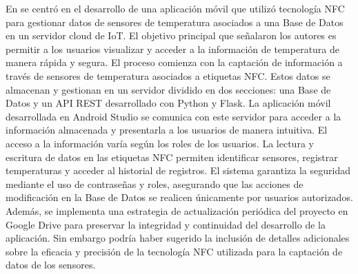 \bigbreak
En \cite{castillo_herrero_desarrollo_2020} se centró en el desarrollo de una aplicación móvil que utilizó tecnología NFC para gestionar datos de sensores de temperatura asociados a una Base de Datos en un servidor cloud de IoT. El objetivo principal que señalaron los autores es permitir a los usuarios visualizar y acceder a la información de temperatura de manera rápida y segura. El proceso comienza con la captación de información a través de sensores de temperatura asociados a etiquetas NFC. Estos datos se almacenan y gestionan en un servidor dividido en dos secciones: una Base de Datos y un API REST desarrollado con Python y Flask. La aplicación móvil desarrollada en Android Studio se comunica con este servidor para acceder a la información almacenada y presentarla a los usuarios de manera intuitiva. El acceso a la información varía según los roles de los usuarios. La lectura y escritura de datos en las etiquetas NFC permiten identificar sensores, registrar temperaturas y acceder al historial de registros. El sistema garantiza la seguridad mediante el uso de contraseñas y roles, asegurando que las acciones de modificación en la Base de Datos se realicen únicamente por usuarios autorizados. Además, se implementa una estrategia de actualización periódica del proyecto en Google Drive para preservar la integridad y continuidad del desarrollo de la aplicación. Sin embargo podría haber sugerido la inclusión de detalles adicionales sobre la eficacia y precisión de la tecnología NFC utilizada para la captación de datos de los sensores.

